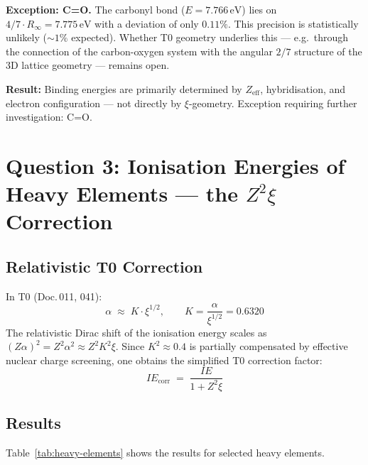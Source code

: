 \textbf{Exception: C=O.}
The carbonyl bond ($E = 7.766\,\mathrm{eV}$) lies on
$4/7 \cdot R_\infty = 7.775\,\mathrm{eV}$ with a deviation of only $0.11\%$.
This precision is statistically unlikely ($\sim1\%$ expected). Whether
T0 geometry underlies this — e.g.\ through the connection of the
carbon-oxygen system with the angular $2/7$ structure of the 3D lattice
geometry — remains open.

\textbf{Result:} Binding energies are primarily determined by $Z_\mathrm{eff}$,
hybridisation, and electron configuration — not directly by $\xi$-geometry.
Exception requiring further investigation: C=O.

\section{Question 3: Ionisation Energies of Heavy Elements — the \texorpdfstring{$Z^2\xi$}{Z²ξ} Correction}
\label{sec:heavy-elements}

\subsection{Relativistic T0 Correction}
\label{subsec:rel-correction}

In T0 (Doc.\,011, 041):
\begin{equation}
  \alpha \;\approx\; K \cdot \xi^{1/2}, \qquad K = \frac{\alpha}{\xi^{1/2}} = 0.6320
\end{equation}
The relativistic Dirac shift of the ionisation energy scales as
$(Z\alpha)^2 = Z^2 \alpha^2 \approx Z^2 K^2 \xi$.
Since $K^2 \approx 0.4$ is partially compensated by effective nuclear charge
screening, one obtains the simplified T0 correction factor:
\begin{equation}
  \boxed{IE_\mathrm{corr} \;=\; \frac{IE}{1 + Z^2 \xi}}
  \label{eq:IE-corr}
\end{equation}

\subsection{Results}
\label{subsec:results-heavy}

Table~\ref{tab:heavy-elements} shows the results for selected heavy elements.

